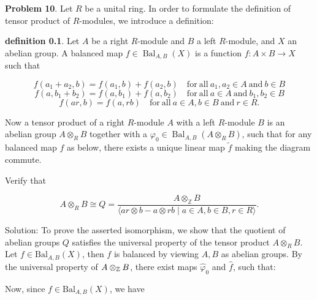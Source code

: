 \begin{dang}
\textbf{Problem 10}. Let $R$ be a unital ring. In order to formulate the definition of tensor product of $R$-modules, 
we introduce a definition:\par 
\textbf{definition 0.1}. Let $A$ be a right $R$-module and $B$ a left $R$-module, and $X$ an abelian group. 
A balanced map $f\in \operatorname{Bal}_{A,B}(X)$ is a function $f:A\times B\to X$ such that

\[
f(a_{1} + a_{2},b) = f(a_{1},b) + f(a_{2},b)\quad \mathrm{for~all~}a_{1},a_{2}\in A\mathrm{~and~}b\in B
\]
\[
f(a,b_{1} + b_{2}) = f(a,b_{1}) + f(a,b_{2})\quad \mathrm{for~all~}a\in A\mathrm{~and~}b_{1},b_{2}\in B
\]
\[
f(ar,b) = f(a,rb)\quad \mathrm{for~all~}a\in A,b\in B\mathrm{~and~}r\in R.
\]

Now a tensor product of a right $R$-module $A$ with a left $R$-module $B$ is an abelian group $A \otimes_R B$ 
together with a $\varphi_0 \in \operatorname{Bal}_{A,B}(A \otimes_R B)$, such that for any balanced map $f$ as below, 
there exists a unique linear map $\tilde{f}$ making the diagram commute.

\begin{center}
\end{center}

Verify that

\[
A\otimes_{R}B\cong Q = \frac{A\otimes_{\mathbb{Z}}B}{\langle ar\otimes b - a\otimes rb\mid a\in A,b\in B,r\in R\rangle}.
\]
\end{dang}
Solution:  To prove the asserted isomorphism, we show that the quotient of abelian groups $Q$ satisfies the universal 
property of the tensor product $A\otimes_RB$. Let $f\in\text{Bal}_{A,B}(X)$, then $f$ is balanced by viewing $A,B$ 
as abelian groups. By the universal property of $A\otimes_{\mathbb{Z}}B$, there exist maps
$\hat{\varphi}_0$ and $\hat{f}$, such that:
\begin{center}
\end{center}
Now, since $f\in \text{Bal}_{A,B}(X)$, we have 

